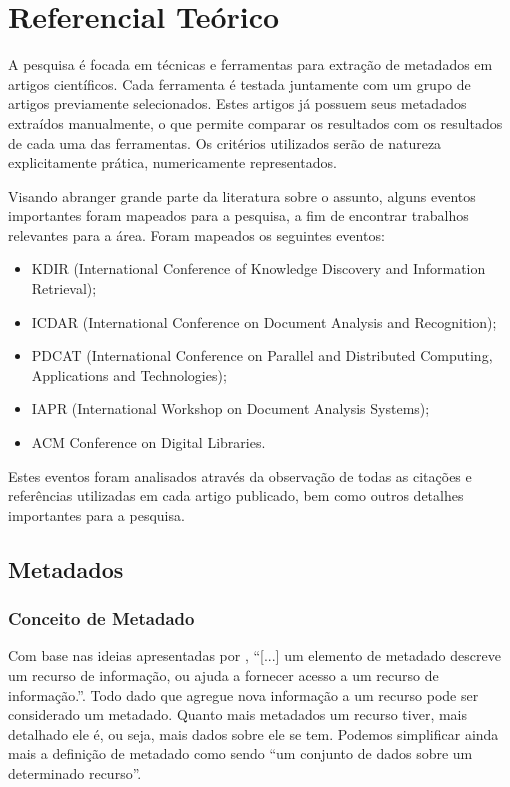 
\chapter{Referencial Teórico}
\label{cha:literature}

A pesquisa é focada em técnicas e ferramentas para extração de metadados em artigos científicos. Cada ferramenta é testada juntamente com um grupo de artigos previamente selecionados. Estes artigos já possuem seus metadados extraídos manualmente, o que permite comparar os resultados com os resultados de cada uma das ferramentas. Os critérios utilizados serão de natureza explicitamente prática, numericamente representados.

Visando abranger grande parte da literatura sobre o assunto, alguns eventos importantes foram mapeados para a pesquisa, a fim de encontrar trabalhos relevantes para a área. Foram mapeados os seguintes eventos:

\begin{itemize}
    \item KDIR (International Conference of Knowledge Discovery and Information Retrieval);
    \item ICDAR (International Conference on Document Analysis and Recognition);
    \item PDCAT (International Conference on Parallel and Distributed Computing, Applications and Technologies);
    \item IAPR (International Workshop on Document Analysis Systems);
    \item ACM Conference on Digital Libraries.
\end{itemize}

Estes eventos foram analisados através da observação de todas as citações e referências utilizadas em cada artigo publicado, bem como outros detalhes importantes para a pesquisa.

\section{Metadados}
\label{sec:metadados}

\subsection{Conceito de Metadado}
\label{ssec:metadata-concept}

Com base nas ideias apresentadas por \cite{meta-dados}, ``[...] um elemento de metadado descreve um recurso de informação, ou ajuda a fornecer acesso a um recurso de informação.''. Todo dado que agregue nova informação a um recurso pode ser considerado um metadado. Quanto mais metadados um recurso tiver, mais detalhado ele é, ou seja, mais dados sobre ele se tem. Podemos simplificar ainda mais a definição de metadado como sendo ``um conjunto de dados sobre um determinado recurso''.

